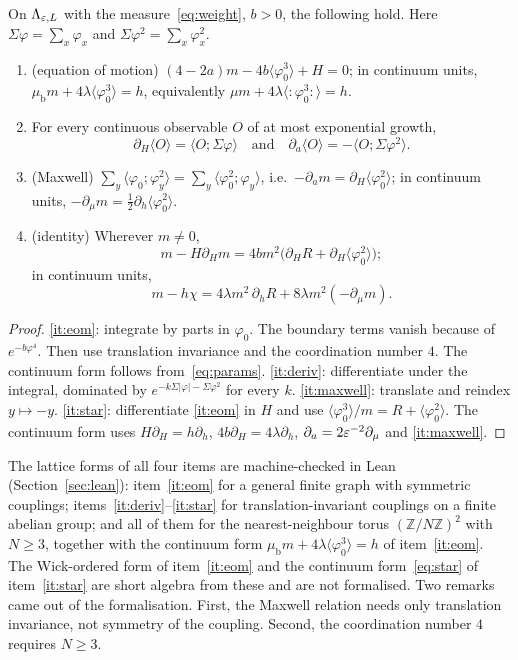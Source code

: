 \begin{theorem}\label{thm:identity}
On $\Lambda_{\varepsilon,L}$ with the measure~\eqref{eq:weight}, $b>0$, the following hold. Here $\Sigma\varphi=\sum_x\varphi_x$ and $\Sigma\varphi^2=\sum_x\varphi_x^2$.
\begin{enumerate}
\item\label{it:eom} (equation of motion) $(4-2a)m-4b\langle\varphi_0^3\rangle+H=0$; in continuum units, $\mu_{\mathrm b}m+4\lambda\langle\varphi_0^3\rangle=h$, equivalently $\mu m+4\lambda\langle{:}\varphi_0^3{:}\rangle=h$.
\item\label{it:deriv} For every continuous observable $O$ of at most exponential growth,
\[
\partial_H\langle O\rangle=\langle O;\Sigma\varphi\rangle \quad\text{and}\quad \partial_a\langle O\rangle=-\langle O;\Sigma\varphi^2\rangle.
\]
\item\label{it:maxwell} (Maxwell) $\sum_y\langle\varphi_0;\varphi_y^2\rangle=\sum_y\langle\varphi_0^2;\varphi_y\rangle$, i.e.\ $-\partial_am=\partial_H\langle\varphi_0^2\rangle$; in continuum units, $-\partial_\mu m=\tfrac12\partial_h\langle\varphi_0^2\rangle$.
\item\label{it:star} (identity) Wherever $m\neq0$,
\[
m-H\partial_Hm=4bm^2\big(\partial_HR+\partial_H\langle\varphi_0^2\rangle\big);
\]
in continuum units,
\begin{equation}\label{eq:star}
m-h\chi=4\lambda m^2\,\partial_hR+8\lambda m^2(-\partial_\mu m).
\end{equation}
\end{enumerate}
\end{theorem}

\begin{proof}
\ref{it:eom}: integrate by parts in $\varphi_0$. The boundary terms vanish because of $e^{-b\varphi^4}$. Then use translation invariance and the coordination number $4$. The continuum form follows from~\eqref{eq:params}. \ref{it:deriv}: differentiate under the integral, dominated by $e^{-k\Sigma|\varphi|-\Sigma\varphi^2}$ for every $k$. \ref{it:maxwell}: translate and reindex $y\mapsto-y$. \ref{it:star}: differentiate \ref{it:eom} in $H$ and use $\langle\varphi_0^3\rangle/m=R+\langle\varphi_0^2\rangle$. The continuum form uses $H\partial_H=h\partial_h$, $4b\partial_H=4\lambda\partial_h$, $\partial_a=2\varepsilon^{-2}\partial_\mu$ and \ref{it:maxwell}.
\end{proof}

The lattice forms of all four items are machine-checked in Lean (Section~\ref{sec:lean}): item~\ref{it:eom} for a general finite graph with symmetric couplings; items~\ref{it:deriv}--\ref{it:star} for translation-invariant couplings on a finite abelian group; and all of them for the nearest-neighbour torus $(\mathbb Z/N\mathbb Z)^2$ with $N\ge3$, together with the continuum form $\mu_{\mathrm b}m+4\lambda\langle\varphi_0^3\rangle=h$ of item~\ref{it:eom}. The Wick-ordered form of item~\ref{it:eom} and the continuum form~\eqref{eq:star} of item~\ref{it:star} are short algebra from these and are not formalised. Two remarks came out of the formalisation. First, the Maxwell relation needs only translation invariance, not symmetry of the coupling. Second, the coordination number $4$ requires $N\ge3$.

